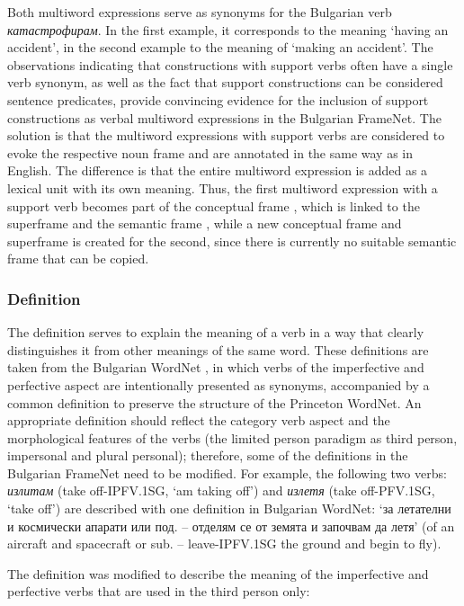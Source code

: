 \documentclass[output=paper,colorlinks,citecolor=brown]{langscibook}
\begin{document}
Both multiword expressions serve as synonyms for the Bulgarian verb \textit{ка\-тастрофирам}. In the first example, it corresponds to the meaning  `having an accident',  in the second example to the meaning of `making an accident'. The observations indicating that constructions with support verbs often have a single verb synonym, as well as the fact that support constructions can be considered sentence predicates, provide convincing evidence for the inclusion of support constructions as verbal multiword expressions in the Bulgarian FrameNet. The solution is that the multiword expressions with support verbs are considered to evoke the respective noun frame and are annotated in the same way as in English. The difference is that the entire multiword expression is added as a lexical unit with its own meaning. Thus, the first multiword expression with a support verb becomes part of the conceptual frame  , which is linked to the superframe and the semantic frame , while a new conceptual frame and superframe is created for the second, since there is currently no suitable semantic frame that can be copied.

\subsubsection{Definition} 

The definition serves to explain the meaning of a verb in a way that clearly distinguishes it from other meanings of the same word. These definitions are taken from the Bulgarian WordNet \citep[57--58]{koeva2021}, in which verbs of the imperfective and perfective aspect are intentionally presented as synonyms, accompanied by a common definition to preserve the structure of the Princeton WordNet. An appropriate definition should reflect the category verb aspect and the morphological features of the verbs (the limited person paradigm as third person, impersonal and plural personal); therefore, some of the definitions in the Bulgarian FrameNet need to be modified. For example, the following two verbs: \emph{излитам} (take off-IPFV.1SG, `am taking off') and \emph{излетя} (take off-PFV.1SG, `take off') are described with one definition in Bulgarian WordNet: 
`за летателни и космически апарати или под. -- отделям се от земята и започвам да летя' (of an aircraft and spacecraft or sub. -- leave-IPFV.1SG the ground and begin to fly).

The definition was modified to describe the meaning of the imperfective and perfective verbs that are used in the third person only:
\end{document}
